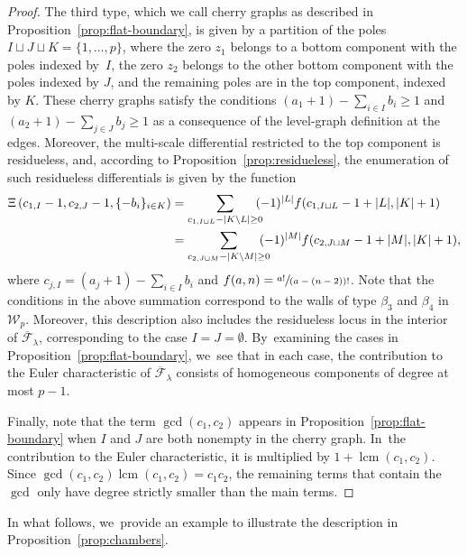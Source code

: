 \documentclass[JEP,XML,SOM,Unicode,NoFloatCountersInSection,published]{cedram}
\DeclareMathOperator{\lcm}{lcm}
\theoremstyle{definition}
\begin{document}
\begin{proof}
The third type, which we call cherry graphs as described in Proposition~\ref{prop:flat-boundary}, is given by a partition of the poles $I\sqcup J \sqcup K=\{1,\ldots,p\}$, where the zero $z_1$ belongs to a bottom component with the poles indexed by~$I$, the zero $z_2$ belongs to the other bottom component with the poles indexed by $J$, and the remaining poles are in the top component, indexed by $K$. These cherry graphs satisfy the conditions $(a_1+1)-\sum_{i\in I}b_i\geq 1$ and $(a_2+1)-\sum_{j\in J}b_j\geq 1$ as a consequence of the level-graph definition at the edges. Moreover, the multi-scale differential restricted to the top component is residueless, and, according to Proposition~\ref{prop:residueless}, the enumeration of such residueless differentials is given by the function
\begin{align*}
\Xi\left(c_{1,I}-1,c_{2,J}-1, \{-b_i\}_{i\in K}\right) & = \sum_{c_{1,I\sqcup L}-|K\setminus L|\geq 0}\hspace*{-2mm}(-1)^{|L|}f(c_{1,I\sqcup L}-1+|L|,|K|+1)\\
& = \sum_{c_{2,J\sqcup M}-|K\setminus M|\geq 0}\hspace*{-3mm}(-1)^{|M|}f(c_{2,J\sqcup M}-1+|M|,|K|+1),
\end{align*}
where $c_{j,I}=(a_j+1)-\sum_{i\in I}b_i$ and $f(a,n)=\sfrac{a!}{(a-(n-2))!}$. Note that the conditions in the above summation correspond to the walls of type $\beta_3$ and $\beta_4$ in $\mathcal{W}_p$. Moreover, this description also includes the residueless locus in the interior of $\overline{\mathcal{F}}_\lambda$, corresponding to the case $I=J=\emptyset$. By~examining the cases in Proposition~\ref{prop:flat-boundary}, we~see that in each case, the contribution to the Euler characteristic of $\overline{\mathcal{F}}_\lambda$ consists of homogeneous components of degree at most $p-1$.

Finally, note that the term $\gcd (c_1, c_2)$ appears in Proposition~\ref{prop:flat-boundary}
when $I$ and $J$ are both nonempty in the cherry graph. In~the contribution to the Euler characteristic, it is multiplied by $1+\lcm (c_1, c_2)$. Since $\gcd(c_1, c_2) \lcm(c_1, c_2) = c_1c_2$, the remaining terms that contain the $\gcd$ only have degree strictly smaller than the main terms.
\end{proof}

In what follows, we~provide an example to illustrate the description in Proposition~\ref{prop:chambers}.
\end{document}
